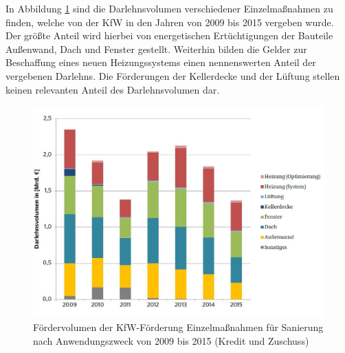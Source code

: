 In Abbildung \ref{fig: Abbildung241} sind die Darlehnsvolumen verschiedener Einzelmaßnahmen zu finden, welche von der KfW in den Jahren von 2009 bis 2015 vergeben wurde.
Der größte Anteil wird hierbei von energetischen Ertüchtigungen der Bauteile Außenwand, Dach und Fenster gestellt.
Weiterhin bilden die Gelder zur Beschaffung eines neuen Heizungssystems einen nennenswerten Anteil der vergebenen Darlehns.
Die Förderungen der Kellerdecke und der Lüftung stellen keinen relevanten Anteil des Darlehnsvolumen dar.

\begin{figure}[t]
	\centering
		\includegraphics{Pictures/FoerdervolumenEinzelmassnahmen.jpg}
	\caption{Fördervolumen der KfW-Förderung Einzelmaßnahmen für Sanierung nach Anwendungszweck von 2009 bis 2015 (Kredit und Zuschuss) \cite{Bigalke.2016}}
	\label{fig: Abbildung241} 
\end{figure}
